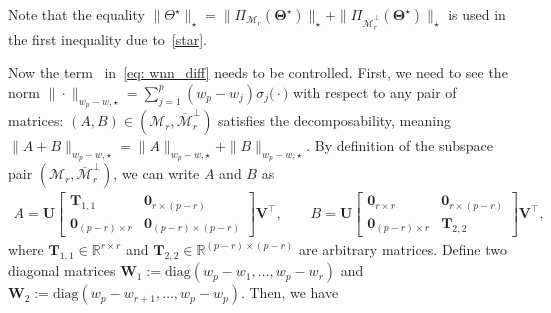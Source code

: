 \documentclass[alpha-refs]{wiley-article}
\newcommand{\RN}[1]{ \textup{\uppercase\expandafter{\romannumeral#1}} }
\begin{document}
Note that the equality $\|\Theta^\star\|_{\star}=\|\Pi_{\mathcal{M}_{r}}(\boldsymbol{\Theta^{\star}})\|_{\star} + \|\Pi_{\overline{\mathcal{M}}_{r}^{\perp}}(\boldsymbol{\Theta^{\star}})\|_{\star}$ is used in the first inequality due to~\eqref{star}.

Now the term~\RN{2} in~\eqref{eq: wnn_diff} needs to be controlled.
First, we need to see the norm $ \|\cdot\|_{w_{p} - w, \star} = \sum^{p}_{j = 1} (w_{p}-w_{j}) \sigma_{j}\big(\cdot\big)$ with respect to any pair of matrices: $(A,B)\in(\mathcal{M}_{r},\overline{\mathcal{M}}_{r}^{\perp})$ satisfies the decomposability, meaning $
\|A+B\|_{w_{p} - w, \star}=\|A\|_{w_{p} - w, \star}+\|B\|_{w_{p} - w, \star}$.
By definition of the subspace pair $(\mathcal{M}_{r},\overline{\mathcal{M}}_{r}^{\perp})$, we can write $A$ and $B$ as
\begin{align*}
    A = \boldsymbol{U}
    \begin{bmatrix}
        \boldsymbol{T}_{1,1} & \boldsymbol{0}_{r\times (p-r)} \\
        \boldsymbol{0}_{(p-r) \times r} & \boldsymbol{0}_{(p-r) \times (p-r)}
    \end{bmatrix}
    \boldsymbol{V}^{\top}, \qquad
    B = \boldsymbol{U}
    \begin{bmatrix}
        \boldsymbol{0}_{r \times r} & \boldsymbol{0}_{r\times (p-r)} \\
        \boldsymbol{0}_{(p-r) \times r} & \boldsymbol{T}_{2,2}
    \end{bmatrix}
    \boldsymbol{V}^{\top},
\end{align*}
where $\boldsymbol{T}_{1,1}\in\mathbb{R}^{r \times r}$ and $\boldsymbol{T}_{2,2}\in\mathbb{R}^{(p-r) \times (p-r)}$ are arbitrary matrices.
Define two diagonal matrices $\boldsymbol{W}_{1}:=\text{diag}(w_{p}-w_{1},\dots,w_{p}-w_{r})$ and $\boldsymbol{W}_{2}:=\text{diag}(w_{p}-w_{r+1},\dots,w_{p}-w_{p})$.
Then, we have
\end{document}
